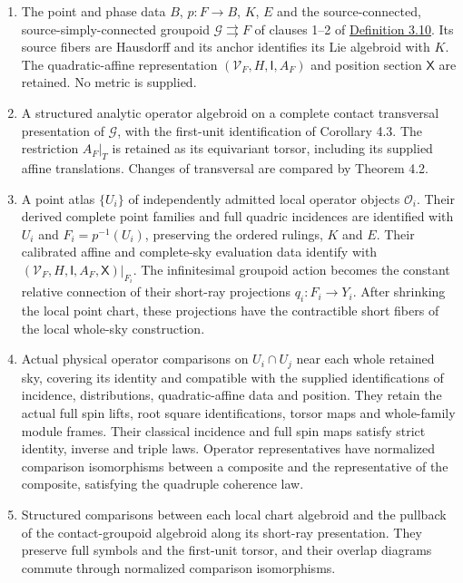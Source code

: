 \documentclass[
  english,
  11pt,
  reqno]{amsart}
\providecommand{\tightlist}{%
  \setlength{\itemsep}{0pt}\setlength{\parskip}{0pt}}
\begin{document}
\begin{enumerate}
\tightlist
\item
  The point and phase data \(B\), \(p:F\to B\), \(K\), \(E\) and the
  source-connected, source-simply-connected groupoid
  \(\mathcal G\rightrightarrows F\) of clauses 1--2 of
  \hyperref[def:independent-monodromy-source-v092]{Definition 3.10}. Its
  source fibers are Hausdorff and its anchor identifies its Lie
  algebroid with \(K\). The quadratic-affine representation
  \((\mathcal V_F,H,\mathsf I,A_F)\) and position section \(\mathsf X\)
  are retained. No metric is supplied.
\item
  A structured analytic operator algebroid on a complete contact
  transversal presentation of \(\mathcal G\), with the first-unit
  identification of Corollary 4.3. The restriction \(A_F|_T\) is
  retained as its equivariant torsor, including its supplied affine
  translations. Changes of transversal are compared by Theorem 4.2.
\item
  A point atlas \(\{U_i\}\) of independently admitted local operator
  objects \(\mathcal O_i\). Their derived complete point families and
  full quadric incidences are identified with \(U_i\) and
  \(F_i=p^{-1}(U_i)\), preserving the ordered rulings, \(K\) and \(E\).
  Their calibrated affine and complete-sky evaluation data identify with
  \((\mathcal V_F,H,\mathsf I,A_F,\mathsf X)|_{F_i}\). The infinitesimal
  groupoid action becomes the constant relative connection of their
  short-ray projections \(q_i:F_i\to Y_i\). After shrinking the local
  point chart, these projections have the contractible short fibers of
  the local whole-sky construction.
\item
  Actual physical operator comparisons on \(U_i\cap U_j\) near each
  whole retained sky, covering its identity and compatible with the
  supplied identifications of incidence, distributions, quadratic-affine
  data and position. They retain the actual full spin lifts, root square
  identifications, torsor maps and whole-family module frames. Their
  classical incidence and full spin maps satisfy strict identity,
  inverse and triple laws. Operator representatives have normalized
  comparison isomorphisms between a composite and the representative of
  the composite, satisfying the quadruple coherence law.
\item
  Structured comparisons between each local chart algebroid and the
  pullback of the contact-groupoid algebroid along its short-ray
  presentation. They preserve full symbols and the first-unit torsor,
  and their overlap diagrams commute through normalized comparison
  isomorphisms.
\end{enumerate}
\end{document}
